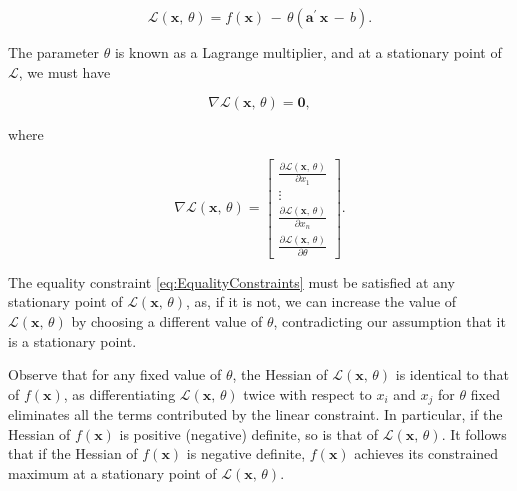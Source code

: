 \documentclass[graybox,envcountchap,sectrefs]{svmono}\usepackage[]{graphicx}\usepackage[]{xcolor}
\begin{document}
\begin{appendices}
\begin{equation}
\mathcal{L}\left(\mathrm{\mathbf{x}},\,\theta\right)=f\left(\mathrm{\mathbf{x}}\right)\,-\,\theta\left(\mathrm{\mathbf{a^{\prime}\,x}}\,-\,b\right).\label{eq:Lagrangian}
\end{equation}

The parameter $\theta$ is known as a Lagrange multiplier, and at
a stationary point of $\mathcal{L}$, we must have 

\begin{equation}
\nabla\mathcal{L}\left(\mathrm{\mathbf{x}},\,\theta\right)=\mathbf{0},\label{eq:GradientLagrangianEq0}
\end{equation}

where

\begin{equation}
\nabla\mathcal{L}\left(\mathrm{\mathbf{x}},\,\theta\right)=\left[\begin{array}{c}
\frac{\partial\mathcal{L}\left(\mathrm{\mathbf{x}},\,\theta\right)}{\partial x_{1}}\\
\vdots\\
\frac{\partial\mathcal{L}\left(\mathrm{\mathbf{x}},\,\theta\right)}{\partial x_{n}}\\
\frac{\partial\mathcal{L}\left(\mathrm{\mathbf{x}},\,\theta\right)}{\partial\theta}
\end{array}\right].\label{eq:GradientLagrangianDefinition}
\end{equation}

The equality constraint \eqref{eq:EqualityConstraints} must be satisfied
at any stationary point of $\mathcal{L}\left(\mathrm{\mathbf{x}},\,\theta\right)$,
as, if it is not, we can increase the value of $\mathcal{L}\left(\mathrm{\mathbf{x}},\,\theta\right)$
by choosing a different value of $\theta$, contradicting our assumption
that it is a stationary point. 

Observe that for any fixed value of $\theta$, the Hessian of $\mathcal{L}\left(\mathrm{\mathbf{x}},\,\theta\right)$
is identical to that of $f\left(\mathrm{\mathbf{x}}\right)$, as differentiating
$\mathcal{L}\left(\mathrm{\mathbf{x}},\,\theta\right)$ twice with
respect to $x_{i}$ and $x_{j}$ for $\theta$ fixed eliminates all
the terms contributed by the linear constraint. In particular, if
the Hessian of $f\left(\mathrm{\mathbf{x}}\right)$ is positive (negative)
definite, so is that of $\mathcal{L}\left(\mathrm{\mathbf{x}},\,\theta\right)$.
It follows that if the Hessian of $f\left(\mathrm{\mathbf{x}}\right)$
is negative definite, $f\left(\mathrm{\mathbf{x}}\right)$ achieves
its constrained maximum at a stationary point of $\mathcal{L}\left(\mathrm{\mathbf{x}},\,\theta\right)$. 


\end{appendices}
\end{document}
